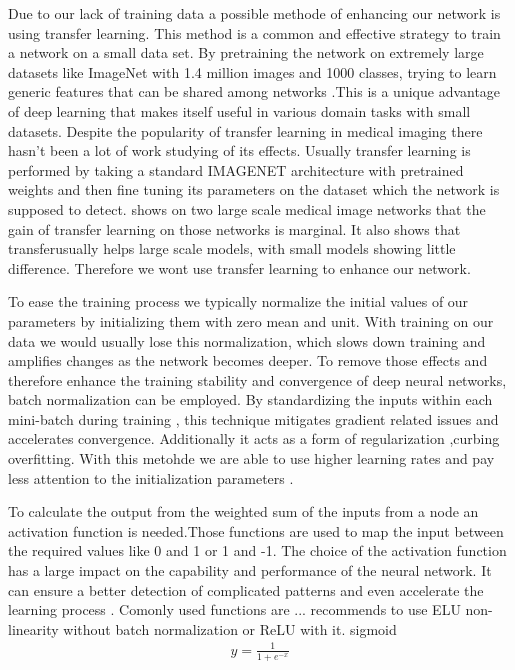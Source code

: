 \documentclass[
a4paper, 
12pt,
grayscalebody, %
abstract=on,
twoside, BCOR10mm, 12pt, DIV13,headinclude, footexclude, final, abstracton, openright
]{ibireprt}
\numberwithin{equation}{chapter}
\numberwithin{table}{chapter}
\numberwithin{figure}{chapter}
\numberwithin{algorithm}{chapter}
\numberwithin{example}{chapter}
\numberwithin{example}{chapter}
\begin{document}
Due to our lack of training data a possible methode of enhancing our network is using transfer learning. This method is a common and effective strategy to train a network on a small data set. By pretraining the network on extremely large datasets like ImageNet with 1.4 million images and 1000 classes, trying to learn generic features that can be shared among networks \cite{Yamashita2018}.This is a unique advantage of deep learning that makes itself useful in various domain tasks with small datasets. Despite the popularity of transfer learning in medical imaging there hasn't been a lot of work studying of its effects. Usually transfer learning is performed by taking a standard IMAGENET architecture with pretrained weights and then fine tuning its parameters on the dataset which the network is supposed to detect.
\cite{NEURIPS2019_eb1e7832} shows on two large scale medical image networks that the gain of transfer learning on those networks is marginal. It also shows that transferusually helps large scale models, with small models showing little difference. Therefore we wont use transfer learning to enhance our network.


To ease the training process we typically normalize the initial values of our parameters by initializing them with zero mean and unit. With training on our data we would usually lose this normalization, which slows down training and amplifies changes as the network becomes deeper. %
 To remove those effects and therefore enhance the training stability and convergence of deep neural networks, batch normalization\cite{Ioffe2015} can be employed. By standardizing the inputs within each mini-batch during training , this technique mitigates gradient related issues and accelerates convergence. Additionally it acts as a form of regularization ,curbing overfitting. With this metohde we are able to use higher learning rates and pay less attention to the initialization parameters \cite{Ruder2016}.  
 
 
To calculate the output from the weighted sum of the inputs from a node an activation function is needed.Those functions are used to map the input between the required values like 0 and 1 or 1 and -1.  The choice of the activation function has a large impact on the capability and performance of the neural network. It can ensure a better detection of complicated patterns and even accelerate the learning process \cite{Khan2020}. Comonly used functions are ... \cite{Mishkin2017} recommends to use ELU non-linearity without batch normalization or ReLU with it.
sigmoid
\begin{align}
	y = \frac{1}{1+e^{-x}}
\end{align}
\end{document}

